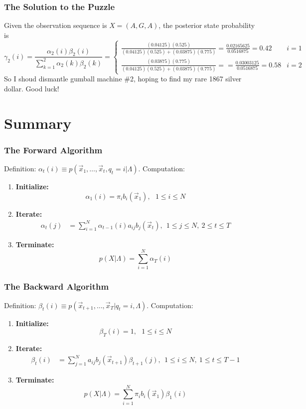 \documentclass{beamer}
\begin{document}
\begin{frame}
  \frametitle{The Solution to the Puzzle}

  Given the observation sequence is $X=(A,G,A)$, 
  the posterior state probability is
  \[
  \gamma_2(i)=\frac{\alpha_2(i)\beta_2(i)}{\sum_{k=1}^2\alpha_2(k)\beta_2(k)}
  = \begin{cases}
    \frac{(0.04125)(0.525)}{(0.04125)(0.525)+(0.03875)(0.775)}
    =\frac{0.02165625}{0.0516875} = 0.42 & i=1\\
    \frac{(0.03875)(0.775)}{(0.04125)(0.525)+(0.03875)(0.775)} =
    =\frac{0.03003125}{0.0516875}= 0.58 & i=2
  \end{cases}
  \]
  So I shoud dismantle gumball machine \#2, hoping to find my rare
  1867 silver dollar.  Good luck!
\end{frame}

\section[Summary]{Summary}
\setcounter{subsection}{1}

\begin{frame}
  \frametitle{The Forward Algorithm}

  Definition: $\alpha_t(i) \equiv p(\vec{x}_1,\ldots,\vec{x}_t,q_t=i|\Lambda)$.  Computation:
  \begin{enumerate}
  \item {\bf Initialize:}
    \[
    \alpha_1(i) = \pi_i b_i(\vec{x}_1),~~~1\le i\le N
    \]
  \item {\bf Iterate:}
    \begin{align*}
      \alpha_{t}(j) &= \sum_{i=1}^N \alpha_{t-1}(i) a_{ij}b_j(\vec{x}_t),~~1\le j\le N,~2\le t\le T
    \end{align*}
  \item {\bf Terminate:}
    \[
    p(X|\Lambda) = \sum_{i=1}^N \alpha_T(i)
    \]
  \end{enumerate}
\end{frame}
  
\begin{frame}
  \frametitle{The Backward Algorithm}

  Definition: $\beta_t(i) \equiv p(\vec{x}_{t+1},\ldots,\vec{x}_T|q_t=i,\Lambda)$.  Computation:
  \begin{enumerate}
  \item {\bf Initialize:}
    \[
    \beta_T(i) = 1,~~~1\le i\le N
    \]
  \item {\bf Iterate:}
    \begin{align*}
      \beta_{t}(i) &= \sum_{j=1}^N a_{ij}b_j(\vec{x}_{t+1})\beta_{t+1}(j),~~1\le i\le N,~1\le t\le T-1
    \end{align*}
  \item {\bf Terminate:}
    \[
    p(X|\Lambda) = \sum_{i=1}^N \pi_ib_i(\vec{x}_1)\beta_1(i)
    \]
  \end{enumerate}
\end{frame}
\end{document}
